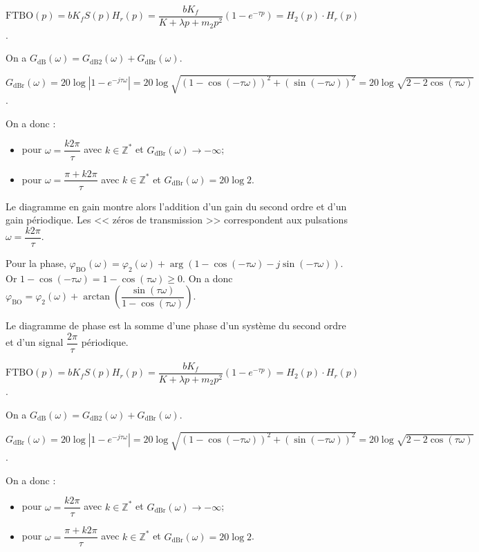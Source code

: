 \begin{corrige}



$\text{FTBO}(p)=bK_f S(p)H_r(p)= \dfrac{bK_f}{K+\lambda p +m_2 p^2}\left(1-e^{-\tau p}\right) = H_2(p)\cdot H_r(p)$.

On a $G_{\text{dB}}(\omega)=G_{\text{dB2}}(\omega) + G_{\text{dBr}}(\omega)$.

$G_{\text{dBr}}(\omega) = 20\log \left|1-e^{-j\tau \omega} \right|=20\log 
\sqrt{\left( 1-\cos \left(-\tau \omega \right)\right)^2 + \left( \sin \left(-\tau \omega \right)\right)^2 } = 20\log \sqrt{2-2\cos \left( \tau \omega \right)}$.

On a donc :
\begin{itemize}
\item pour $\omega=\dfrac{k2\pi }{\tau}$ avec $k\in \mathbb{Z}^*$ et $G_{\text{dBr}}(\omega) \to -\infty $;
\item pour $\omega=\dfrac{\pi + k2\pi }{\tau}$ avec $k\in \mathbb{Z}^*$ et $G_{\text{dBr}}(\omega) = 20 \log 2$.
\end{itemize}

Le diagramme en gain montre alors l'addition d'un gain du second ordre et d'un gain périodique. Les << zéros de transmission >> correspondent aux pulsations $\omega=\dfrac{k2\pi }{\tau}$.

Pour la phase, $\varphi_{\text{BO}}\left( \omega\right)=\varphi_2\left( \omega\right)+\arg\left( 1-\cos\left( -\tau\omega\right) - j\sin\left(-\tau\omega\right)\right)$. Or $1-\cos\left( -\tau\omega\right) = 1-\cos\left( \tau \omega \right) \geq 0$. On a donc 
 $\varphi_{\text{BO}}=\varphi_2\left( \omega\right)+\arctan \left(\dfrac{\sin\left( \tau\omega\right)}{1-\cos\left( \tau\omega\right)} \right)$.

Le diagramme de  phase est la somme d'une phase d'un système du second ordre et d'un signal $\dfrac{2\pi}{\tau}$ périodique. 




$\text{FTBO}(p)=bK_f S(p)H_r(p)= \dfrac{bK_f}{K+\lambda p +m_2 p^2}\left(1-e^{-\tau p}\right) = H_2(p)\cdot H_r(p)$.

On a $G_{\text{dB}}(\omega)=G_{\text{dB2}}(\omega) + G_{\text{dBr}}(\omega)$.

$G_{\text{dBr}}(\omega) = 20\log \left|1-e^{-j\tau \omega} \right|=20\log 
\sqrt{\left( 1-\cos \left(-\tau \omega \right)\right)^2 + \left( \sin \left(-\tau \omega \right)\right)^2 } = 20\log \sqrt{2-2\cos \left( \tau \omega \right)}$.

On a donc :
\begin{itemize}
\item pour $\omega=\dfrac{k2\pi }{\tau}$ avec $k\in \mathbb{Z}^*$ et $G_{\text{dBr}}(\omega) \to -\infty $;
\item pour $\omega=\dfrac{\pi + k2\pi }{\tau}$ avec $k\in \mathbb{Z}^*$ et $G_{\text{dBr}}(\omega) = 20 \log 2$.
\end{itemize}


\end{corrige}
